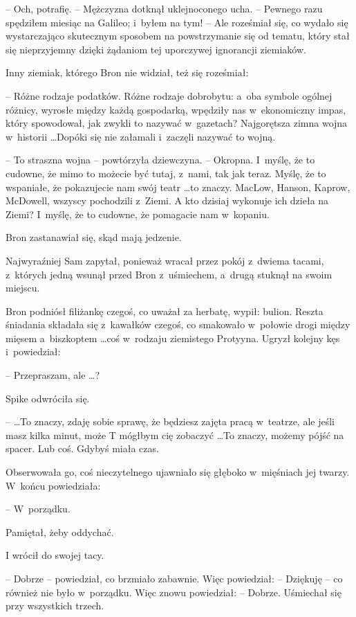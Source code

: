 \documentclass[oneside,polish,11pt,rmheadings]{mwbk}
\begin{document}
-- Och, potrafię. -- Mężczyzna dotknął uklejnoconego ucha. -- Pewnego razu spędziłem miesiąc na Galileo; i~byłem na tym! -- Ale roześmiał się, co wydało się wystarczająco skutecznym sposobem na powstrzymanie się od tematu, który stał się nieprzyjemny dzięki żądaniom tej uporczywej ignorancji ziemiaków. 

Inny ziemiak, którego Bron nie widział, też się roześmiał: 

-- Różne rodzaje podatków. Różne rodzaje dobrobytu: a~oba symbole ogólnej różnicy, wyrosłe między każdą gospodarką, wpędziły nas w~ekonomiczny impas, który spowodował, jak zwykli to nazywać w~gazetach? Najgorętsza zimna wojna w~historii \ldots  Dopóki się nie załamali i~zaczęli nazywać to wojną. 

-- To straszna wojna -- powtórzyła dziewczyna. -- Okropna. I~myślę, że to cudowne, że mimo to możecie być tutaj, z~nami, tak jak teraz. Myślę, że to wspaniałe, że pokazujecie nam swój teatr \ldots  to znaczy. MacLow, Hanson, Kaprow, McDowell, wszyscy pochodzili z~Ziemi. A kto dzisiaj wykonuje ich dzieła na Ziemi? I~myślę, że to cudowne, że pomagacie nam w~kopaniu. 

Bron zastanawiał się, skąd mają jedzenie. 

Najwyraźniej Sam zapytał, ponieważ wracał przez pokój z~dwiema tacami, z~których jedną wsunął przed Bron z~uśmiechem, a~drugą stuknął na swoim miejscu. 

Bron podniósł filiżankę czegoś, co uważał za herbatę, wypił: bulion. Reszta śniadania składała się z~kawałków czegoś, co smakowało w~połowie drogi między mięsem a~biszkoptem \ldots  coś w~rodzaju ziemistego Protyyna. Ugryzł kolejny kęs i~powiedział: 

-- Przepraszam, ale \ldots ? 

Spike odwróciła się. 

-- \ldots To znaczy, zdaję sobie sprawę, że będziesz zajęta pracą w~teatrze, ale jeśli masz kilka minut, może T mógłbym cię zobaczyć \ldots   To znaczy, możemy pójść na spacer. Lub coś. Gdybyś miała czas. 

Obserwowała go, coś nieczytelnego ujawniało się głęboko w~mięśniach jej twarzy. W~końcu powiedziała: 

-- W~porządku. 

Pamiętał, żeby oddychać. 

I wrócił do swojej tacy. 

-- Dobrze -- powiedział, co brzmiało zabawnie. Więc powiedział: -- Dziękuję -- co również nie było w~porządku. Więc znowu powiedział: -- Dobrze. Uśmiechał się przy wszystkich trzech. 
\end{document}
